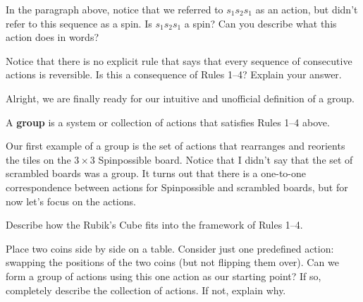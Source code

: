 \begin{exercise}
In the paragraph above, notice that we referred to $s_1 s_2 s_1$ as an action, but didn't refer to this sequence as a spin. Is $s_1 s_2 s_1$ a spin?  Can you describe what this action does in words?
\end{exercise}

\begin{exercise}
Notice that there is no explicit rule that says that every sequence of consecutive actions is reversible.  Is this a consequence of Rules 1--4?  Explain your answer.
\end{exercise}

Alright, we are finally ready for our intuitive and unofficial definition of a group.

\begin{intuitivedef}\label{def:informal_group}
A \textbf{group} is a system or collection of actions that satisfies Rules 1--4 above.
\end{intuitivedef}

Our first example of a group is the set of actions that rearranges and reorients the tiles on the $3\times 3$ Spinpossible board.  Notice that I didn't say that the set of scrambled boards was a group.  It turns out that there is a one-to-one correspondence between actions for Spinpossible and scrambled boards, but for now let's focus on the actions.

\begin{exercise}
Describe how the Rubik's Cube fits into the framework of Rules 1--4.
\end{exercise}

\begin{exercise}\label{exer:2coins}%
Place two coins side by side on a table.  Consider just one predefined action: swapping the positions of the two coins (but not flipping them over).  Can we form a group of actions using this one action as our starting point?  If so, completely describe the collection of actions.  If not, explain why.
\end{exercise}


